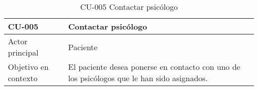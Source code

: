 \begin{table}[htpb]
\centering
\caption{CU-005 Contactar psicólogo}                                                                                                                                                                                                                                                                                                                                                                                                                                                                                                                                                                                                                                                                                                 
\begin{tabularx}{\textwidth}{|X|X|}
\hline
CU-005                            & Contactar psicólogo                                                                                                                                                                                                                                                                                                                                                                                                                                                                                                                                                                                                                                                                                                        \\ \hline
Actor principal                   & Paciente                                                                                                                                                                                                                                                                                                                                                                                                                                                                                                                                                                                                                                                                                                                   \\ \hline
Objetivo en contexto              & El paciente desea ponerse en contacto con uno de los psicólogos que le han sido asignados.                                                                                                                                                                                                                                                                                                                                                                                                                                                                                                                                                                                                                                 \\ \hline

\end{tabularx}
\end{table}
